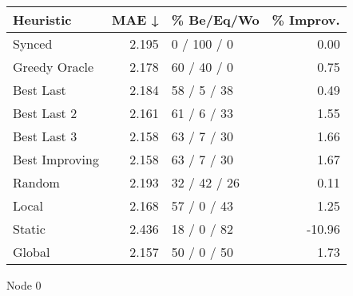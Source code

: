 \begin{tabular}{lrlr}
\toprule
\textbf{Heuristic} & \textbf{MAE ↓} & \textbf{\% Be/Eq/Wo} & \textbf{\% Improv.} \\
\midrule
            Synced &          2.195 &          0 / 100 / 0 &                0.00 \\
     Greedy Oracle &          2.178 &          60 / 40 / 0 &                0.75 \\
         Best Last &          2.184 &          58 / 5 / 38 &                0.49 \\
       Best Last 2 &          2.161 &          61 / 6 / 33 &                1.55 \\
       Best Last 3 &          2.158 &          63 / 7 / 30 &                1.66 \\
    Best Improving &          2.158 &          63 / 7 / 30 &                1.67 \\
            Random &          2.193 &         32 / 42 / 26 &                0.11 \\
             Local &          2.168 &          57 / 0 / 43 &                1.25 \\
            Static &          2.436 &          18 / 0 / 82 &              -10.96 \\
            Global &          2.157 &          50 / 0 / 50 &                1.73 \\
\bottomrule
\end{tabular}
\caption{Node 0}
\label{tab:ds_iid_lr01_le1_bs4_0}
